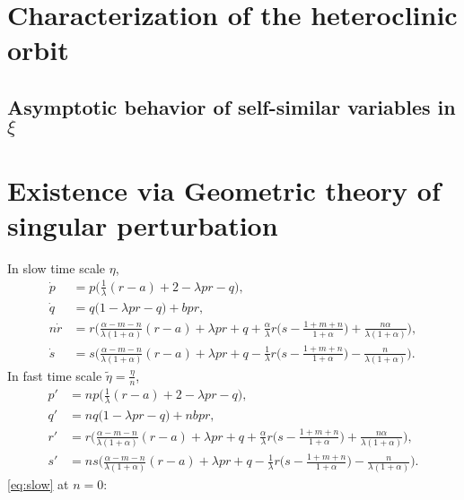 \documentclass[a4paper,11pt]{article}
\begin{document}
\section{Characterization of the heteroclinic orbit}
\subsection{Asymptotic behavior of self-similar variables in $\xi$}
\pagebreak
\section{Existence via Geometric theory of singular perturbation}
In slow time scale $\eta$,
\begin{equation}
 \begin{aligned}
 \dot{p} &=p\Big(\frac{1}{\lambda}(r-a) + 2- \lambda p r -q\Big),\\
 \dot{q} &=q\Big(1 -\lambda p r -q\Big) + b p r,\\
 n\dot{r} &=r\Big(\frac{\alpha-m-n}{\lambda(1+\alpha)}(r-a) + \lambda pr + q +\frac{\alpha}{\lambda}r\big(s- \frac{1+m+n}{1+\alpha}\big) + \frac{n\alpha}{\lambda(1+\alpha)}\Big),\\
 \dot{s} &=s\Big(\frac{\alpha-m-n}{\lambda(1+\alpha)}(r-a) + \lambda pr + q - \frac{1}{\lambda}r\big(s- \frac{1+m+n}{1+\alpha}\big) - \frac{n}{\lambda(1+\alpha)}\Big).
 \end{aligned}
\end{equation}
In fast time scale $\tilde\eta=\frac{\eta}{n}$,
\begin{equation} \label{eq:fast}
 \begin{aligned}
 {p}' &=np\Big(\frac{1}{\lambda}(r-a) + 2- \lambda p r -q\Big),\\
 {q}' &=nq\Big(1 -\lambda p r -q\Big) + nb p r,\\
 {r}' &=r\Big(\frac{\alpha-m-n}{\lambda(1+\alpha)}(r-a) + \lambda pr + q +\frac{\alpha}{\lambda}r\big(s- \frac{1+m+n}{1+\alpha}\big) + \frac{n\alpha}{\lambda(1+\alpha)}\Big),\\
 {s}' &=ns\Big(\frac{\alpha-m-n}{\lambda(1+\alpha)}(r-a) + \lambda pr + q - \frac{1}{\lambda}r\big(s- \frac{1+m+n}{1+\alpha}\big) - \frac{n}{\lambda(1+\alpha)}\Big).
 \end{aligned}
\end{equation}
\eqref{eq:slow} at $n=0$:
\end{document}
